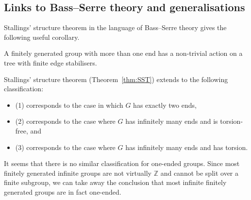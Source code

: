 \subsection{Links to Bass--Serre theory and generalisations}

Stallings' structure theorem in the language of Bass--Serre theory gives the following useful corollary. 
\begin{corollary}
    A finitely generated group with more than one end has a non-trivial action on a tree with finite edge stabilisers.
\end{corollary}

\begin{theorem}
    Stallings' structure theorem (Theorem~\ref{thm:SST}) extends to the following classification: 
    \begin{itemize}
        \item (1) corresponds to the case in which \(G\) has exactly two ends,
        \item (2) corresponds to the case where \(G\) has infinitely many ends and is torsion-free, and
        \item (3) corresponds to the case where \(G\) has infinitely many ends and has torsion.
    \end{itemize}
\end{theorem}

It seems that there is no similar classification for one-ended groups. Since most finitely generated infinite groups are not virtually \(\mathbb{Z}\) and cannot be split over a finite subgroup, we can take away the conclusion that most infinite finitely generated groups are in fact one-ended.

